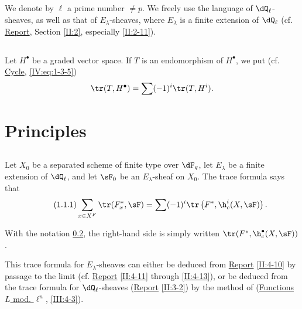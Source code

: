 \documentclass[oneside]{book}
\begin{document}
\subsection{}\label{VI:0-2}

We denote by $\ell$ a prime number $\ne p$. We freely use the 
language of $\dQ_\ell$-sheaves, as well as that of $E_\lambda$-sheaves, 
where $E_\lambda$ is a finite extension of $\dQ_\ell$ (cf. \hyperref[II]{Report}, 
Section \ref{II:2}, especially \ref{II:2-11}). 





\subsection{}\label{VI:0-3}

Let $H^\bullet$ be a graded vector space. If $T$ is an endomorphism of 
$H^\bullet$, we put (cf. \hyperref[IV]{Cycle}, \ref{IV:eq:1-3-5}) 
\[
  \tr(T,H^\bullet) = \sum (-1)^i \tr(T,H^i) \text{.}
\]










\section{Principles}\label{VI:1}





\subsection{}\label{VI:1-1}

Let $X_0$ be a separated scheme of finite type over $\dF_q$, let $E_\lambda$ be a 
finite extension of $\dQ_\ell$, and let $\sF_0$ be an $E_\lambda$-sheaf on $X_0$. The 
trace formula says that 
\begin{equation*}\tag{1.1.1}\label{VI:eq:1-1-1}
  \sum_{x\in X^F} \tr(F_x^\ast,\sF) = \sum (-1)^i \tr\left(F^\ast,\h_c^i(X,\sF)\right) \text{.}
\end{equation*}

With the notation \ref{VI:0-3}, the right-hand side is simply written 
$\tr(F^\ast,\h_c^\bullet(X,\sF))$. 

This trace formula for $E_\lambda$-sheaves can either be 
deduced from \hyperref[II]{Report} \ref{II:4-10} by passage to the limit (cf. 
\hyperref[II]{Report} \ref{II:4-11} through \ref{II:4-13}), or be deduced 
from the trace formula for $\dQ_\ell$-sheaves (\hyperref[II]{Report} 
\ref{II:3-2}) by the method of (\hyperref[III]{Functions $L$ mod. $\ell^n$}, 
\ref{III:4-3}). 
\end{document}
